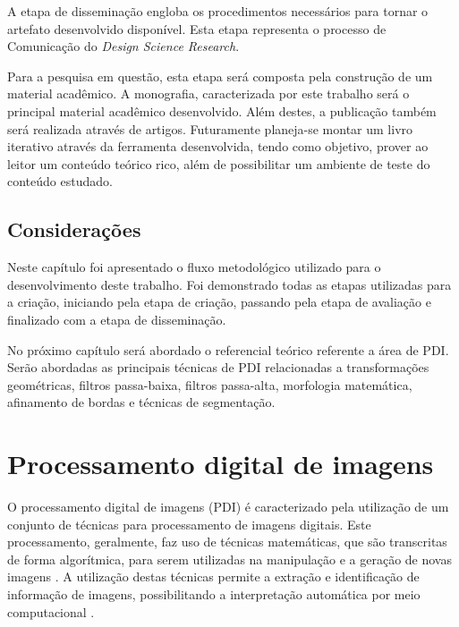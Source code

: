 \documentclass[
	12pt,				%
	oneside,			%
	a4paper,			%
	english,			%
	french,				%
	spanish,			%
	brazil,				%
	]{abntex2}
\begin{document}
A etapa de disseminação engloba os procedimentos necessários para tornar o artefato desenvolvido disponível. Esta etapa representa o processo de Comunicação do  \textit{Design Science Research}.

Para a pesquisa em questão, esta etapa será composta pela construção de um material acadêmico. A monografia, caracterizada por este trabalho será o principal material acadêmico desenvolvido. Além destes, a publicação também será realizada através de artigos. Futuramente planeja-se montar um livro iterativo através da ferramenta desenvolvida, tendo como objetivo, prover ao leitor um conteúdo teórico rico, além de possibilitar um ambiente de teste do conteúdo estudado.

\section{Considerações}

Neste capítulo foi apresentado o fluxo metodológico utilizado para o desenvolvimento deste trabalho. Foi demonstrado todas as etapas utilizadas para a criação, iniciando pela etapa de criação, passando pela etapa de avaliação e finalizado com a etapa de disseminação. 

No próximo capítulo será abordado o referencial teórico referente a área de PDI. Serão abordadas as principais técnicas de PDI relacionadas a transformações geométricas, filtros passa-baixa, filtros passa-alta, morfologia matemática, afinamento de bordas e técnicas de segmentação.


\chapter{Processamento digital de imagens}
\label{sec:pdi}

O  processamento digital de imagens (PDI) é caracterizado pela utilização de um conjunto de técnicas para processamento de imagens digitais. Este processamento, geralmente, faz uso de técnicas matemáticas, que são transcritas de forma algorítmica, para serem utilizadas na manipulação e a geração de novas imagens \cite{gonzalesWoods:2008}. A utilização destas técnicas permite a extração e identificação de informação de imagens, possibilitando a interpretação automática por meio computacional \cite{pedriniSchwartz:2008}.
\end{document}
